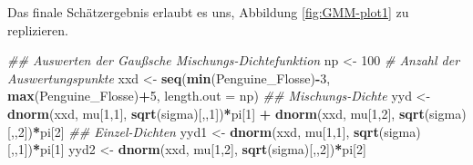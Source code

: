 \documentclass[
  ngerman,
]{book}
\newenvironment{Shaded}{\begin{snugshade}}{\end{snugshade}}
\newcommand{\CommentTok}[1]{\textcolor[rgb]{0.56,0.35,0.01}{\textit{#1}}}
\newcommand{\DataTypeTok}[1]{\textcolor[rgb]{0.13,0.29,0.53}{#1}}
\newcommand{\DecValTok}[1]{\textcolor[rgb]{0.00,0.00,0.81}{#1}}
\newcommand{\KeywordTok}[1]{\textcolor[rgb]{0.13,0.29,0.53}{\textbf{#1}}}
\newcommand{\NormalTok}[1]{#1}
\newcommand{\OperatorTok}[1]{\textcolor[rgb]{0.81,0.36,0.00}{\textbf{#1}}}
\newcommand{\StringTok}[1]{\textcolor[rgb]{0.31,0.60,0.02}{#1}}
\begin{document}
Das finale Schätzergebnis erlaubt es uns, Abbildung \ref{fig:GMM-plot1} zu replizieren.

\begin{Shaded}
\begin{Highlighting}[]
\CommentTok{## Auswerten der Gaußsche Mischungs-Dichtefunktion}
\NormalTok{np      <-}\StringTok{ }\DecValTok{100} \CommentTok{# Anzahl der Auswertungspunkte}
\NormalTok{xxd     <-}\StringTok{ }\KeywordTok{seq}\NormalTok{(}\KeywordTok{min}\NormalTok{(Penguine_Flosse)}\OperatorTok{-}\DecValTok{3}\NormalTok{, }\KeywordTok{max}\NormalTok{(Penguine_Flosse)}\OperatorTok{+}\DecValTok{5}\NormalTok{, }\DataTypeTok{length.out =}\NormalTok{ np)}
\CommentTok{## Mischungs-Dichte}
\NormalTok{yyd     <-}\StringTok{ }\KeywordTok{dnorm}\NormalTok{(xxd, mu[}\DecValTok{1}\NormalTok{,}\DecValTok{1}\NormalTok{], }\KeywordTok{sqrt}\NormalTok{(sigma)[,,}\DecValTok{1}\NormalTok{])}\OperatorTok{*}\NormalTok{pi[}\DecValTok{1}\NormalTok{] }\OperatorTok{+}
\StringTok{           }\KeywordTok{dnorm}\NormalTok{(xxd, mu[}\DecValTok{1}\NormalTok{,}\DecValTok{2}\NormalTok{], }\KeywordTok{sqrt}\NormalTok{(sigma)[,,}\DecValTok{2}\NormalTok{])}\OperatorTok{*}\NormalTok{pi[}\DecValTok{2}\NormalTok{]}
\CommentTok{## Einzel-Dichten}
\NormalTok{yyd1    <-}\StringTok{ }\KeywordTok{dnorm}\NormalTok{(xxd, mu[}\DecValTok{1}\NormalTok{,}\DecValTok{1}\NormalTok{], }\KeywordTok{sqrt}\NormalTok{(sigma)[,,}\DecValTok{1}\NormalTok{])}\OperatorTok{*}\NormalTok{pi[}\DecValTok{1}\NormalTok{]}
\NormalTok{yyd2    <-}\StringTok{ }\KeywordTok{dnorm}\NormalTok{(xxd, mu[}\DecValTok{1}\NormalTok{,}\DecValTok{2}\NormalTok{], }\KeywordTok{sqrt}\NormalTok{(sigma)[,,}\DecValTok{2}\NormalTok{])}\OperatorTok{*}\NormalTok{pi[}\DecValTok{2}\NormalTok{]}


\end{Highlighting}
\end{Shaded}
\end{document}
